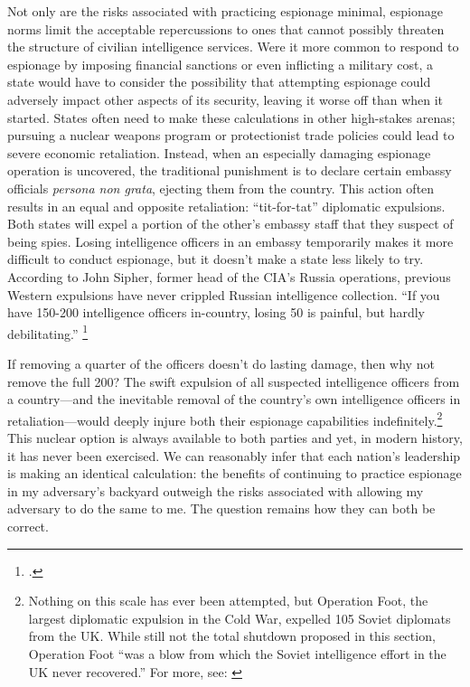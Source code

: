 \documentclass[12pt]{extarticle}
\begin{document}

Not only are the risks associated with practicing espionage minimal, espionage norms limit the acceptable repercussions to ones that cannot possibly threaten the structure of civilian intelligence services. Were it more common to respond to espionage by imposing financial sanctions or even inflicting a military cost, a state would have to consider the possibility that attempting espionage could adversely impact other aspects of its security, leaving it worse off than when it started. States often need to make these calculations in other high-stakes arenas; pursuing a nuclear weapons program or protectionist trade policies could lead to severe economic retaliation. Instead, when an especially damaging espionage operation is uncovered, the traditional punishment is to declare certain embassy officials \emph{persona non grata}, ejecting them from the country. This action often results in an equal and opposite retaliation: \enquote{tit-for-tat} diplomatic expulsions. Both states will expel a portion of the other's embassy staff that they suspect of being spies. Losing intelligence officers in an embassy temporarily makes it more difficult to conduct espionage, but it doesn't make a state less likely to try. According to John Sipher, former head of the CIA's Russia operations, previous Western expulsions have never crippled Russian intelligence collection. \enquote{If you have 150-200 intelligence officers in-country, losing 50 is painful, but hardly debilitating.} \footcite{dettmer_united_2018}

If removing a quarter of the officers doesn't do lasting damage, then why not remove the full 200? The swift expulsion of all suspected intelligence officers from a country---and the inevitable removal of the country's own intelligence officers in retaliation---would deeply injure both their espionage capabilities indefinitely.\footnote{Nothing on this scale has ever been attempted, but Operation Foot, the largest diplomatic expulsion in the Cold War, expelled 105 Soviet diplomats from the UK. While still not the total shutdown proposed in this section, Operation Foot \enquote{was a blow from which the Soviet intelligence effort in the UK never recovered.} For more, see: \cite{hughes_giving_2006-1}} This nuclear option is always available to both parties and yet, in modern history, it has never been exercised. We can reasonably infer that each nation's leadership is making an identical calculation: the benefits of continuing to practice espionage in my adversary's backyard outweigh the risks associated with allowing my adversary to do the same to me. The question remains how they can both be correct.
\end{document}
